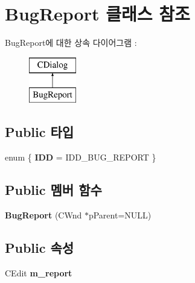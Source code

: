 \hypertarget{class_bug_report}{}\section{Bug\+Report 클래스 참조}
\label{class_bug_report}
Bug\+Report에 대한 상속 다이어그램 \+: \begin{figure}[H]
\begin{center}
\leavevmode
\includegraphics[height=2.000000cm]{class_bug_report}
\end{center}
\end{figure}
\subsection*{Public 타입}
\begin{DoxyCompactItemize}
\item 
\mbox{\label{class_bug_report_ac5c6f1960b86db3b70eab6b21625913e}} 
enum \{ {\bfseries I\+DD} = I\+D\+D\+\_\+\+B\+U\+G\+\_\+\+R\+E\+P\+O\+RT
 \}
\end{DoxyCompactItemize}
\subsection*{Public 멤버 함수}
\begin{DoxyCompactItemize}
\item 
\mbox{\label{class_bug_report_a0b78ee082b1ca2a2a2c16db3d65842fb}} 
{\bfseries Bug\+Report} (C\+Wnd $\ast$p\+Parent=N\+U\+LL)
\end{DoxyCompactItemize}
\subsection*{Public 속성}
\begin{DoxyCompactItemize}
\item 
\mbox{\label{class_bug_report_aef6dd887fcfe40d98d0fa1c6cf2d2466}} 
C\+Edit {\bfseries m\+\_\+report}
\end{DoxyCompactItemize}
